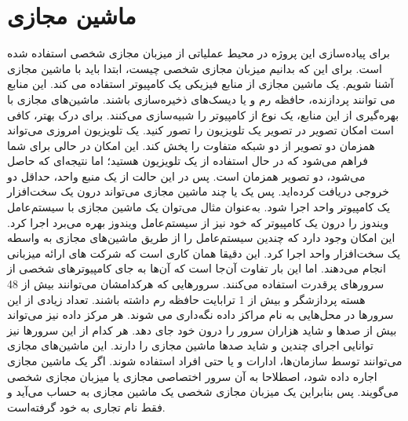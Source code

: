 {\section{ماشین مجازی}
برای پیاده‌سازی این پروژه در محیط عملیاتی از میزبان مجازی شخصی استفاده شده است. برای این که بدانیم میزبان مجازی شخصی چیست، ابتدا باید با ماشین مجازی آشنا شویم. یک ماشین مجازی از منابع فیزیکی یک کامپیوتر استفاده می کند. این منابع می توانند پردازنده، حافظه رم و یا دیسک‌های ذخیره‌سازی باشند. ماشین‌های مجازی با بهره‌گیری از این منابع، یک نوع از کامپیوتر را شبیه‌سازی می‌کنند.
برای درک بهتر، کافی است امکان تصویر در تصویر یک تلویزیون را تصور کنید. یک تلویزیون امروزی می‌تواند همزمان دو تصویر از دو شبکه متفاوت را پخش کند. این امکان در حالی برای شما فراهم می‌شود که در حال استفاده از یک تلویزیون هستید؛ اما نتیجه‌ای که حاصل می‌شود، دو تصویر همزمان است. پس در این حالت از یک منبع واحد، حداقل دو خروجی دریافت کرده‌اید. پس یک یا چند ماشین‌ مجازی می‌تواند درون یک سخت‌افزار یک کامپیوتر واحد اجرا شود. به‌عنوان مثال می‌توان یک ماشین‌ مجازی با سیستم‌عامل ویندوز را درون یک کامپیوتر که خود نیز از سیستم‌عامل ویندوز بهره می‌برد اجرا کرد.
این امکان وجود دارد که چندین سیستم‌عامل را از طریق ماشین‌های مجازی به واسطه یک سخت‌افزار واحد اجرا کرد. این دقیقا همان کاری است که شرکت های ارائه میزبانی انجام می‌دهند. اما این بار تفاوت آن‌جا است که آن‌ها به جای کامپیوترهای شخصی از سرورهای پرقدرت استفاده می‌کنند. سرورهایی که هرکدامشان می‌توانند بیش از 48 هسته پردازشگر و بیش از 1 ترابایت حافظه رم داشته باشند. تعداد زیادی از این سرورها در محل‌هایی به نام مراکز داده نگه‌داری می شوند. هر مرکز داده نیز می‌تواند بیش از صدها و شاید هزاران سرور را درون خود جای دهد. هر کدام از این سرورها نیز توانایی اجرای چندین و شاید صدها ماشین مجازی را دارند.
این ماشین‌های مجازی می‌توانند توسط سازمان‌ها، ادارات و یا حتی افراد استفاده شوند. اگر یک ماشین مجازی اجاره داده شود، اصطلاحا به آن سرور اختصاصی مجازی یا میزبان مجازی شخصی می‌گویند. پس بنابراین یک میزبان مجازی شخصی یک ماشین مجازی به حساب می‌آید و فقط نام تجاری به خود گرفته‌است.
 
}
